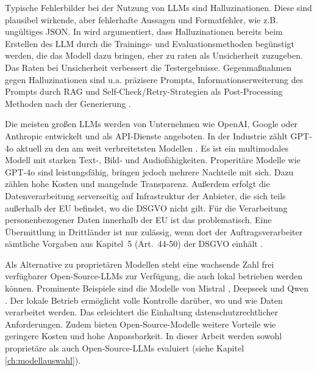 Typische Fehlerbilder bei der Nutzung von \acp{LLM} sind Halluzinationen. Diese sind plausibel wirkende, aber fehlerhafte Aussagen und Formatfehler, wie z.B. ungültiges JSON. In \cite{kalai2025languagemodelshallucinate} wird argumentiert, dass Halluzinationen bereits beim Erstellen des \ac{LLM} durch die Trainings- und Evaluationsmethoden begünstigt werden, die das Modell dazu bringen, eher zu raten als Unsicherheit zuzugeben. Das Raten bei Unsicherheit verbessert die Testergebnisse. Gegenmaßnahmen gegen Halluzinationen sind u.a. präzisere Prompts, Informationserweiterung des Prompts durch \ac{RAG} und Self-Check/Retry-Strategien als Post-Processing Methoden nach der Generierung \cite{ji2023hallucinationsurvey}.

Die meisten großen \acp{LLM} werden von Unternehmen wie OpenAI, Google oder Anthropic entwickelt und als API-Dienste angeboten. In der Industrie zählt GPT-4o aktuell zu den am weit verbreitetsten Modellen \cite{openai-hello-gpt-4o}. Es ist ein multimodales Modell mit starken Text-, Bild- und Audiofähigkeiten. Properitäre Modelle wie GPT-4o sind leistungsfähig, bringen jedoch mehrere Nachteile mit sich. Dazu zählen hohe Kosten und mangelnde Transparenz. Außerdem erfolgt die Datenverarbeitung serverseitig auf Infrastruktur der Anbieter, die sich teils außerhalb der \ac{EU} befindet, wo die \ac{DSGVO} nicht gilt. Für die Verarbeitung personenbezogener Daten innerhalb der \ac{EU} ist das problematisch. Eine Übermittlung in Drittländer ist nur zulässig, wenn dort der Auftragsverarbeiter sämtliche Vorgaben aus Kapitel~5 (Art.~44-50) der \ac{DSGVO} einhält \cite{GDPR2016}.

Als Alternative zu proprietären Modellen steht eine wachsende Zahl frei verfügbarer Open-Source-\acp{LLM} zur Verfügung, die auch lokal betrieben werden können. Prominente Beispiele sind die Modelle von Mistral \cite{mistralai}, Deepseek \cite{deepseek} und Qwen \cite{qwen}. Der lokale Betrieb ermöglicht volle Kontrolle darüber, wo und wie Daten verarbeitet werden. Das erleichtert die Einhaltung datenschutzrechtlicher Anforderungen. Zudem bieten Open-Source-Modelle weitere Vorteile wie geringere Kosten und hohe Anpassbarkeit. In dieser Arbeit werden sowohl proprietäre als auch Open-Source-\acp{LLM} evaluiert (siehe Kapitel \ref{ch:modellauswahl}).
